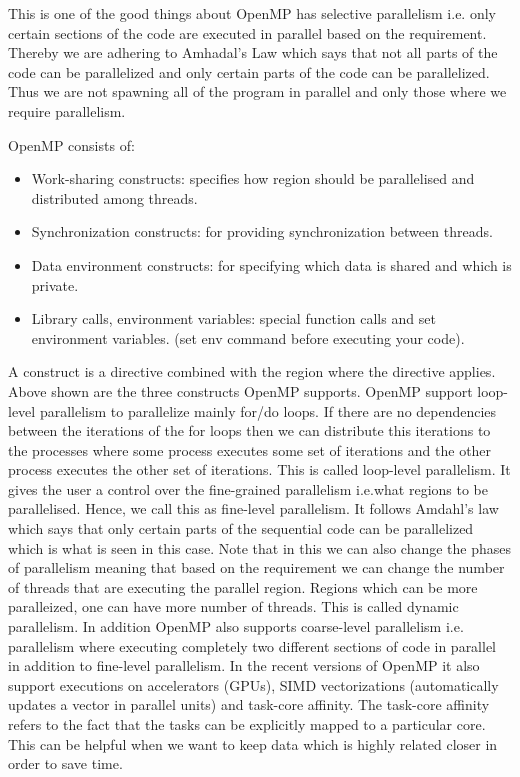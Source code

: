 \documentclass[12pt]{book}
\begin{document}
This is one of the good things about OpenMP has selective parallelism i.e. only certain sections of the code are executed in parallel based on the requirement. Thereby we are adhering to Amhadal's Law which says that not all parts of the code can be parallelized
and only certain parts of the code can be parallelized. Thus we are not spawning all of the program in parallel and only those where we require parallelism.

OpenMP consists of:
\begin{itemize}
\item Work-sharing constructs: specifies how region should be parallelised and distributed among threads.
\item Synchronization constructs: for providing synchronization between threads.
\item Data environment constructs: for specifying which data is shared and which is private.
\item Library calls, environment variables: special function calls and set environment variables. (set env command before executing your code).
\end{itemize}
A construct is a directive combined with the region where the directive applies. Above shown are the three constructs OpenMP supports.
OpenMP support loop-level parallelism to parallelize mainly for/do loops. If there are no dependencies between the iterations of the for loops then we can distribute this iterations to the processes
where some process executes some set of iterations and the other process executes the other set of iterations. This is called loop-level parallelism.
It gives the user a control over the fine-grained parallelism i.e.what regions to be parallelised. Hence, we call this as fine-level parallelism.
It follows Amdahl's law which says that only certain parts of the sequential code can be parallelized which is what is seen in this case. Note that in this we can also change the phases of parallelism meaning that 
based on the requirement we can change the number of threads that are executing the parallel region. Regions which can be more paralleized, one can have more number of threads. This is called dynamic parallelism.
In addition OpenMP also supports coarse-level parallelism i.e. parallelism where executing completely two different sections of code in parallel in addition to fine-level parallelism.
In the recent versions of OpenMP it also support executions on accelerators (GPUs), SIMD vectorizations (automatically updates a vector in parallel units) and task-core affinity.
The task-core affinity refers to the fact that the tasks can be explicitly mapped to a particular core. This can be helpful when we want to keep data which is highly related closer in order to save time.
\end{document}
